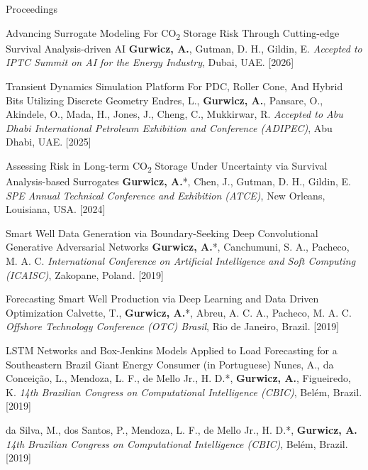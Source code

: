 \begin{cvcontentsection}{Proceedings}

\cvpublication
    {Advancing Surrogate Modeling For CO\textsubscript{2} Storage Risk Through Cutting-edge Survival Analysis-driven AI}
    {\textbf{Gurwicz, A.}, Gutman, D. H., Gildin, E.}
    {\textit{Accepted to IPTC Summit on AI for the Energy Industry}, Dubai, UAE.}
    [2026]

\cvpublication
    {Transient Dynamics Simulation Platform For PDC, Roller Cone, And Hybrid Bits Utilizing Discrete Geometry}
    {Endres, L., \textbf{Gurwicz, A.}, Pansare, O., Akindele, O., Mada, H., Jones, J., Cheng, C., Mukkirwar, R.}
    {\textit{Accepted to Abu Dhabi International Petroleum Exhibition and Conference (ADIPEC)}, Abu Dhabi, UAE.}
    [2025]

\cvpublication
    {Assessing Risk in Long-term CO\textsubscript{2} Storage Under Uncertainty via Survival Analysis-based Surrogates}
    {\textbf{Gurwicz, A.}*, Chen, J., Gutman, D. H., Gildin, E.}
    {\textit{SPE Annual Technical Conference and Exhibition (ATCE)}, New Orleans, Louisiana, USA. }
    [2024]

\cvpublication
    {Smart Well Data Generation via Boundary-Seeking Deep Convolutional Generative Adversarial Networks}
    {\textbf{Gurwicz, A.}*, Canchumuni, S. A., Pacheco, M. A. C.}
    {\textit{International Conference on Artificial Intelligence and Soft Computing (ICAISC)}, Zakopane, Poland. }
    [2019]

\cvpublication
    {Forecasting Smart Well Production via Deep Learning and Data Driven Optimization}
    {Calvette, T., \textbf{Gurwicz, A.}*, Abreu, A. C. A., Pacheco, M. A. C.}
    {\textit{Offshore Technology Conference (OTC) Brasil}, Rio de Janeiro, Brazil. }
    [2019]

\cvpublication
    {LSTM Networks and Box-Jenkins Models Applied to Load Forecasting for a Southeastern Brazil Giant Energy Consumer (in Portuguese)}
    {Nunes, A., da Conceição, L., Mendoza, L. F., de Mello Jr., H. D.*, \textbf{Gurwicz, A.}, Figueiredo, K.}
    {\textit{14th Brazilian Congress on Computational Intelligence (CBIC)}, Belém, Brazil. }
    [2019]

    {da Silva, M., dos Santos, P., Mendoza, L. F., de Mello Jr., H. D.*, \textbf{Gurwicz, A.}}
    {\textit{14th Brazilian Congress on Computational Intelligence (CBIC)}, Belém, Brazil. }
    [2019]

\end{cvcontentsection}

